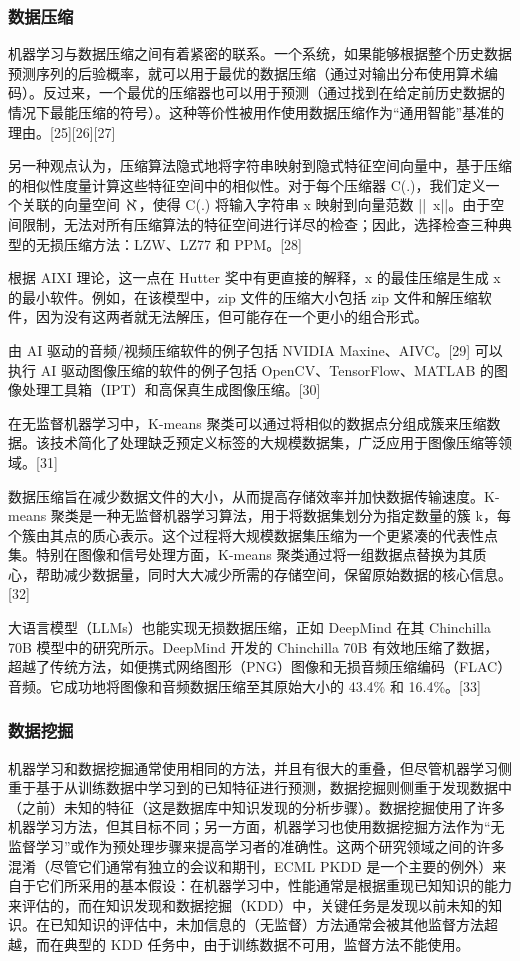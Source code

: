 \subsubsection{数据压缩}  
机器学习与数据压缩之间有着紧密的联系。一个系统，如果能够根据整个历史数据预测序列的后验概率，就可以用于最优的数据压缩（通过对输出分布使用算术编码）。反过来，一个最优的压缩器也可以用于预测（通过找到在给定前历史数据的情况下最能压缩的符号）。这种等价性被用作使用数据压缩作为“通用智能”基准的理由。[25][26][27]  

另一种观点认为，压缩算法隐式地将字符串映射到隐式特征空间向量中，基于压缩的相似性度量计算这些特征空间中的相似性。对于每个压缩器 C(.)，我们定义一个关联的向量空间 ℵ，使得 C(.) 将输入字符串 x 映射到向量范数 ||~x||。由于空间限制，无法对所有压缩算法的特征空间进行详尽的检查；因此，选择检查三种典型的无损压缩方法：LZW、LZ77 和 PPM。[28]  

根据 AIXI 理论，这一点在 Hutter 奖中有更直接的解释，x 的最佳压缩是生成 x 的最小软件。例如，在该模型中，zip 文件的压缩大小包括 zip 文件和解压缩软件，因为没有这两者就无法解压，但可能存在一个更小的组合形式。  

由 AI 驱动的音频/视频压缩软件的例子包括 NVIDIA Maxine、AIVC。[29] 可以执行 AI 驱动图像压缩的软件的例子包括 OpenCV、TensorFlow、MATLAB 的图像处理工具箱（IPT）和高保真生成图像压缩。[30]  

在无监督机器学习中，K-means 聚类可以通过将相似的数据点分组成簇来压缩数据。该技术简化了处理缺乏预定义标签的大规模数据集，广泛应用于图像压缩等领域。[31]  

数据压缩旨在减少数据文件的大小，从而提高存储效率并加快数据传输速度。K-means 聚类是一种无监督机器学习算法，用于将数据集划分为指定数量的簇 k，每个簇由其点的质心表示。这个过程将大规模数据集压缩为一个更紧凑的代表性点集。特别在图像和信号处理方面，K-means 聚类通过将一组数据点替换为其质心，帮助减少数据量，同时大大减少所需的存储空间，保留原始数据的核心信息。[32]  

大语言模型（LLMs）也能实现无损数据压缩，正如 DeepMind 在其 Chinchilla 70B 模型中的研究所示。DeepMind 开发的 Chinchilla 70B 有效地压缩了数据，超越了传统方法，如便携式网络图形（PNG）图像和无损音频压缩编码（FLAC）音频。它成功地将图像和音频数据压缩至其原始大小的 43.4\% 和 16.4\%。[33]
\subsubsection{数据挖掘}  
机器学习和数据挖掘通常使用相同的方法，并且有很大的重叠，但尽管机器学习侧重于基于从训练数据中学习到的已知特征进行预测，数据挖掘则侧重于发现数据中（之前）未知的特征（这是数据库中知识发现的分析步骤）。数据挖掘使用了许多机器学习方法，但其目标不同；另一方面，机器学习也使用数据挖掘方法作为“无监督学习”或作为预处理步骤来提高学习者的准确性。这两个研究领域之间的许多混淆（尽管它们通常有独立的会议和期刊，ECML PKDD 是一个主要的例外）来自于它们所采用的基本假设：在机器学习中，性能通常是根据重现已知知识的能力来评估的，而在知识发现和数据挖掘（KDD）中，关键任务是发现以前未知的知识。在已知知识的评估中，未加信息的（无监督）方法通常会被其他监督方法超越，而在典型的 KDD 任务中，由于训练数据不可用，监督方法不能使用。


